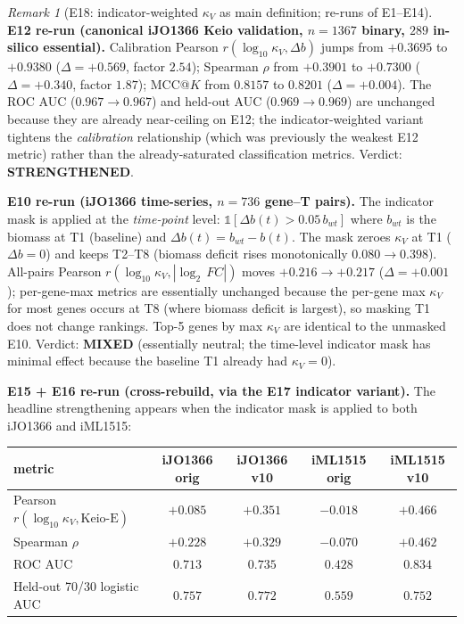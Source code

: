 \documentclass[11pt,a4paper]{article}
\theoremstyle{plain}
\theoremstyle{definition}
\theoremstyle{remark}
\newtheorem{remark}[theorem]{Remark}
\begin{document}
\begin{remark}[E18: indicator-weighted $\kappa_V$ as main definition;
re-runs of E1--E14]
\textbf{E12 re-run (canonical iJO1366 Keio validation, $n=1367$
binary, $289$ in-silico essential).} Calibration Pearson
$r(\log_{10}\kappa_V, \Delta b)$ jumps from $+0.3695$ to $+0.9380$
($\Delta = +0.569$, factor $2.54$); Spearman $\rho$ from $+0.3901$
to $+0.7300$ ($\Delta = +0.340$, factor $1.87$); MCC@$K$ from
$0.8157$ to $0.8201$ ($\Delta = +0.004$). The ROC AUC ($0.967 \to
0.967$) and held-out AUC ($0.969 \to 0.969$) are unchanged because
they are already near-ceiling on E12; the indicator-weighted variant
tightens the \emph{calibration} relationship (which was previously
the weakest E12 metric) rather than the already-saturated
classification metrics. Verdict: \textbf{STRENGTHENED}.

\textbf{E10 re-run (iJO1366 time-series, $n=736$ gene--T pairs).}
The indicator mask is applied at the \emph{time-point} level:
$\mathbb{1}[\Delta b(t) > 0.05\,b_{wt}]$ where $b_{wt}$ is the
biomass at T1 (baseline) and $\Delta b(t) = b_{wt} - b(t)$. The mask
zeroes $\kappa_V$ at T1 ($\Delta b = 0$) and keeps T2--T8 (biomass
deficit rises monotonically $0.080 \to 0.398$). All-pairs Pearson
$r(\log_{10}\kappa_V, |\log_2\,FC|)$ moves $+0.216 \to +0.217$
($\Delta = +0.001$); per-gene-max metrics are essentially unchanged
because the per-gene max $\kappa_V$ for most genes occurs at T8
(where biomass deficit is largest), so masking T1 does not change
rankings. Top-5 genes by max $\kappa_V$ are identical to the
unmasked E10. Verdict: \textbf{MIXED} (essentially neutral; the
time-level indicator mask has minimal effect because the baseline
T1 already had $\kappa_V = 0$).

\textbf{E15 + E16 re-run (cross-rebuild, via the E17 indicator
variant).} The headline strengthening appears when the indicator
mask is applied to both iJO1366 and iML1515:

\begin{center}
\begin{tabular}{lcccc}
\toprule
metric & iJO1366 orig & iJO1366 v10 & iML1515 orig & iML1515 v10 \\
\midrule
Pearson $r(\log_{10}\kappa_V, \text{Keio-E})$
   & $+0.085$ & $+0.351$ & $-0.018$ & $+0.466$ \\
Spearman $\rho$
   & $+0.228$ & $+0.329$ & $-0.070$ & $+0.462$ \\
ROC AUC
   & $0.713$ & $0.735$ & $0.428$ & $0.834$ \\
Held-out 70/30 logistic AUC
   & $0.757$ & $0.772$ & $0.559$ & $0.752$ \\
\bottomrule
\end{tabular}
\end{center}


\end{remark}
\end{document}
